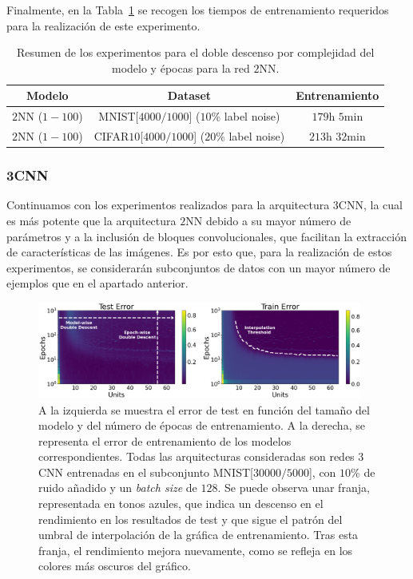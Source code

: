 Finalmente, en la Tabla~\ref{tab:2nn_model-epochwise} se recogen los tiempos de entrenamiento requeridos para la realización de este experimento.

\begin{table}[h!]
    \centering
    \begin{tabular}{|c|c|c|}
    \hline
    \textbf{Modelo}       & \textbf{Dataset} & \textbf{Entrenamiento} \\ 
    \hline
    $2$NN ($1-100$)      & MNIST[$4000/1000$] ($10$\% label noise)        & $179$h $5$min \\ 
    $2$NN ($1-100$)      & CIFAR$10$[$4000/1000$]  ($20$\% label noise)   & $213$h $32$min \\
    \hline
    \end{tabular}
    \caption[Resumen de los experimentos para el doble descenso por complejidad del modelo y épocas para la red $2$NN.]{Resumen de los experimentos para el doble descenso por complejidad del modelo y épocas para la red $2$NN.}\label{tab:2nn_model-epochwise}
\end{table}

\subsubsection{3CNN}\label{subsubsec:model-epoch-wise-3CNN}

Continuamos con los experimentos realizados para la arquitectura $3$CNN, la cual es más potente que la arquitectura $2$NN debido a su mayor número de parámetros y a la inclusión de bloques convolucionales, que facilitan la extracción de características de las imágenes. Es por esto que, para la realización de estos experimentos, se considerarán subconjuntos de datos con un mayor número de ejemplos que en el apartado anterior.

\begin{figure}[h]
    \centering
    \includegraphics[width=0.95\textwidth]{img/experiments/model-epoch3CNNMNIST30k.png}
    \caption[Doble descenso en función del tamaño del modelo y del número de épocas para la red $3$CNN y un subconjunto de MNIST.]{A la izquierda se muestra el error de test en función del tamaño del modelo y del número de épocas de entrenamiento. A la derecha, se representa el error de entrenamiento de los modelos correspondientes. Todas las arquitecturas consideradas son redes $3$CNN entrenadas en el subconjunto MNIST[$30000/5000$], con $10\%$ de ruido añadido y un \textit{batch size} de $128$. Se puede observa unar franja, representada en tonos azules, que indica un descenso en el rendimiento en los resultados de test y que sigue el patrón del umbral de interpolación de la gráfica de entrenamiento. Tras esta franja, el rendimiento mejora nuevamente, como se refleja en los colores más oscuros del gráfico.
}\label{fig:model-epoch3CNNMNIST30k}
\end{figure}

